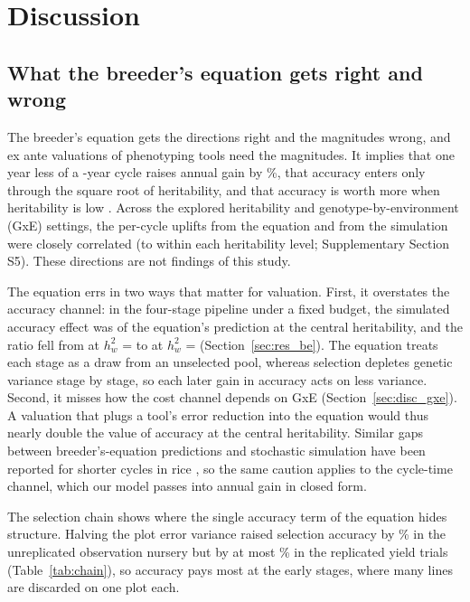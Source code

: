 \section{Discussion}\label{sec:discussion}

\subsection{What the breeder's equation gets right and wrong}\label{sec:disc_be}

The breeder's equation gets the directions right and the magnitudes wrong, and ex ante valuations of phenotyping tools need the magnitudes. It implies that one year less of a \NumCfgCycleYears-year cycle raises annual gain by \NumCycOneYearPct\%, that accuracy enters only through the square root of heritability, and that accuracy is worth more when heritability is low \citep{Cobb2019Enhancing,Hickey2017Genomic}. Across the explored heritability and genotype-by-environment (GxE) settings, the per-cycle uplifts from the equation and from the simulation were closely correlated (\NumBEcorMin to \NumBEcorMax within each heritability level; Supplementary Section S5). These directions are not findings of this study.

The equation errs in two ways that matter for valuation. First, it overstates the accuracy channel: in the four-stage pipeline under a fixed budget, the simulated accuracy effect was \NumBEratioHtwoTen of the equation's prediction at the central heritability, and the ratio fell from \NumBEratioHtwoFive at $h^2_w$ = \NumCfgRobHtwoLow to \NumBEratioHtwoThirty at $h^2_w$ = \NumCfgRobHtwoHigh (Section~\ref{sec:res_be}). The equation treats each stage as a draw from an unselected pool, whereas selection depletes genetic variance stage by stage, so each later gain in accuracy acts on less variance. Second, it misses how the cost channel depends on GxE (Section~\ref{sec:disc_gxe}). A valuation that plugs a tool's error reduction into the equation would thus nearly double the value of accuracy at the central heritability. Similar gaps between breeder's-equation predictions and stochastic simulation have been reported for shorter cycles in rice \citep{Seck2024Stochastic}, so the same caution applies to the cycle-time channel, which our model passes into annual gain in closed form.

The selection chain shows where the single accuracy term of the equation hides structure. Halving the plot error variance raised selection accuracy by \NumChainAccRelONErrFifty\% in the unreplicated observation nursery but by at most \NumChainAccRelAYTErrFifty\% in the replicated yield trials (Table~\ref{tab:chain}), so accuracy pays most at the early stages, where many lines are discarded on one plot each.


